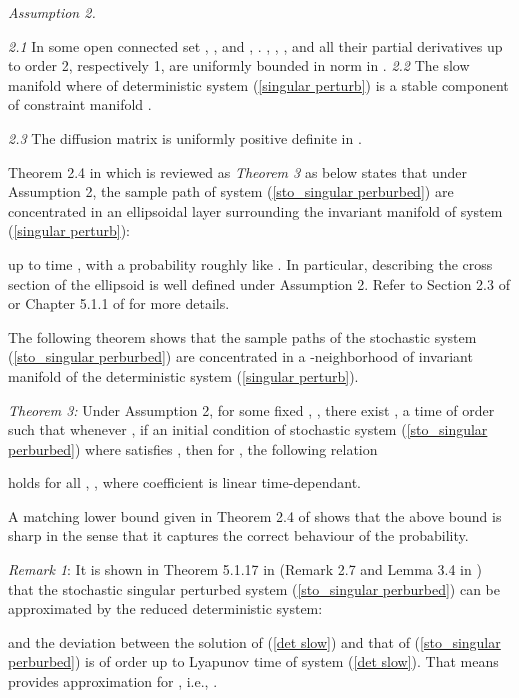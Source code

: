 \documentclass[journal]{IEEEtran}
\begin{document}
\textit{Assumption 2.}

\textit{2.1} In some open connected set , ,  and , . , , ,  and all their partial derivatives up to order 2, respectively 1, are uniformly bounded in norm in . 
\textit{2.2} The slow manifold  where  of deterministic system (\ref{singular perturb}) is a stable component of constraint manifold .

\textit{2.3} The diffusion matrix  is uniformly positive definite in .

Theorem 2.4 in \cite{Gentz:2003} which is reviewed as \textit{Theorem 3} as below states that under Assumption 2, the sample path of system (\ref{sto_singular perburbed}) are concentrated in an ellipsoidal layer surrounding the invariant manifold  of system (\ref{singular perturb}):

up to time , with a probability roughly like . In particular,  describing the cross section of the ellipsoid is well defined under Assumption 2. Refer to Section 2.3 of \cite{Gentz:2003} or Chapter 5.1.1 of \cite{Gentz:2006} for more details.

The following theorem shows that the sample paths of the stochastic system (\ref{sto_singular perburbed}) are concentrated in a -neighborhood of invariant manifold  of the deterministic system (\ref{singular perturb}).



\textit{Theorem 3\cite{Gentz:2003}:} Under Assumption 2, for some fixed , , there exist , a time  of order  such that whenever , if an initial condition of stochastic system (\ref{sto_singular perburbed})  where  satisfies , then for , the following relation

holds for all , , where coefficient  is linear time-dependant.




A matching lower bound given in Theorem 2.4 of \cite{Gentz:2003} shows that the above bound is sharp in the sense that it captures the correct behaviour of the probability.


\textit{Remark 1}: It is shown in Theorem 5.1.17 in \cite{Gentz:2006} (Remark 2.7 and Lemma 3.4 in \cite{Gentz:2003}) that the stochastic singular perturbed system (\ref{sto_singular perburbed}) can be approximated by the reduced deterministic system:

and the deviation between the solution of (\ref{det slow}) and that of (\ref{sto_singular perburbed}) is of order  up to Lyapunov time of system (\ref{det slow}). That means  provides  approximation for , i.e., .
\end{document}
